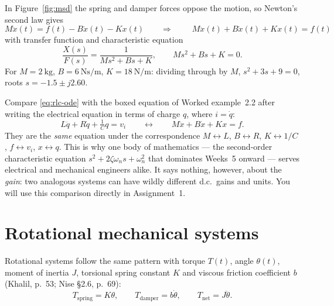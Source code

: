 \documentclass[11pt,a4paper]{article}
\begin{document}
\begin{workedex}[title=Worked example 2.2 --- mass--spring--damper]
In Figure~\ref{fig:msd} the spring and damper forces oppose the motion, so
Newton's second law gives
\[
  M\ddot x(t) = f(t) - B\dot x(t) - Kx(t)
  \qquad\Longrightarrow\qquad
  \boxed{\;M\ddot x(t) + B\dot x(t) + Kx(t) = f(t)\;}
\]
with transfer function and characteristic equation
\[
  \frac{X(s)}{F(s)} = \frac{1}{Ms^2+Bs+K}, \qquad Ms^2+Bs+K=0 .
\]
For $M=\SI{2}{\kilogram}$, $B=\SI{6}{\newton\second\per\metre}$,
$K=\SI{18}{\newton\per\metre}$: dividing through by $M$,
$s^2+3s+9=0$, roots $s=-1.5\pm j2.60$.
\end{workedex}

\begin{keyidea}[title=The force--voltage analogy]
Compare \eqref{eq:rlc-ode} with the boxed equation of Worked example~2.2 after
writing the electrical equation in terms of charge $q$, where $i=\dot q$:
\[
  L\ddot q + R\dot q + \tfrac{1}{C}q = v_i
  \qquad\longleftrightarrow\qquad
  M\ddot x + B\dot x + Kx = f .
\]
They are the \emph{same} equation under the correspondence
$M\leftrightarrow L$, $B\leftrightarrow R$, $K\leftrightarrow 1/C$,
$f\leftrightarrow v_i$, $x\leftrightarrow q$. This is why one body of
mathematics --- the second-order characteristic equation
$s^2+2\zeta\omega_n s+\omega_n^2$ that dominates Weeks~5 onward --- serves
electrical and mechanical engineers alike. It says nothing, however, about the
\emph{gain}: two analogous systems can have wildly different d.c.\ gains and
units. You will use this comparison directly in Assignment~1.
\end{keyidea}

\section{Rotational mechanical systems}
\label{sec:mech-rot}

Rotational systems follow the same pattern with torque $T(t)$, angle
$\theta(t)$, moment of inertia $J$, torsional spring constant $K$ and viscous
friction coefficient $b$ (Khalil, p.~53; Nise \S2.6, p.~69):
\begin{equation}
  T_{\text{spring}} = K\theta, \qquad
  T_{\text{damper}} = b\dot\theta, \qquad
  T_{\text{net}} = J\ddot\theta .
  \label{eq:rot-elements}
\end{equation}
\end{document}
